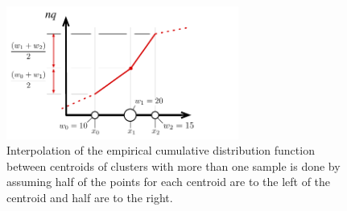 \documentclass[]{statsoc}
\begin{document}
\begin{figure}[p] %
   \centering
   \includegraphics[width=3in]{figures/interpolation.pdf} 
   \caption{Interpolation of the empirical cumulative distribution function between centroids of clusters with more than one sample is done by assuming half of the points for each centroid are to the left of the centroid and half are to the right. }
   \label{fig:interpolation}
\end{figure}
\end{document}
